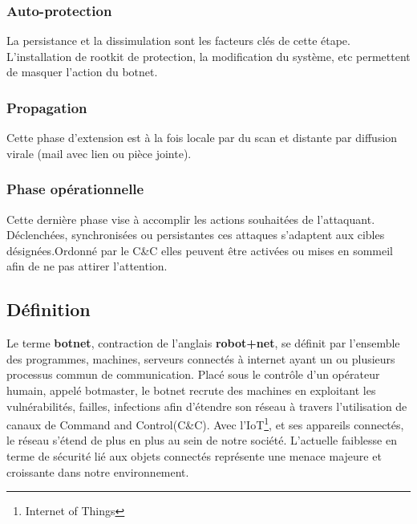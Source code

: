 \subsubsection{Auto-protection}
La persistance et la dissimulation sont les facteurs clés de cette étape. L'installation de rootkit de protection, la modification du système, etc permettent de masquer l'action du botnet.
	
\subsubsection{Propagation}
Cette phase d'extension est à la fois locale par du scan et distante par diffusion virale (mail avec lien ou pièce jointe).
	
\subsubsection{Phase opérationnelle}
Cette dernière phase vise à accomplir les actions souhaitées de l'attaquant. 
Déclenchées, synchronisées ou persistantes ces attaques s'adaptent aux cibles désignées.Ordonné par le C\&C elles peuvent être activées ou mises en sommeil afin de ne pas attirer l'attention.



\subsection{Définition}
\par
Le terme \textbf{botnet}, contraction de l'anglais \textbf{robot+net}, se définit par l'ensemble des programmes, machines, serveurs connectés à internet ayant un ou plusieurs processus commun de communication.
Placé sous le contrôle d'un opérateur humain, appelé botmaster, le botnet recrute des machines en exploitant les vulnérabilités, failles, infections afin d'étendre son réseau à travers l'utilisation de canaux de Command and Control(C\&C).
\newline Avec l'IoT\footnote{Internet of Things}, et ses appareils connectés, le réseau s'étend de plus en plus au sein de notre société. L'actuelle faiblesse en terme de sécurité lié aux objets connectés représente une menace majeure et croissante dans notre environnement.
